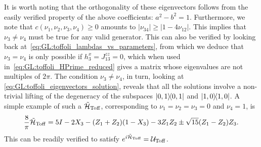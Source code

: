 It is worth noting that the orthogonality of these eigenvectors follows from the easily verified property of the above coefficients: $a^2 - b^2 = 1$.
Furthermore, we note that $c(\nu_1, \nu_2, \nu_3, \nu_4) \ge 0$ amounts to $|\nu_{34}|\ge|1-4\nu_{12}|$.
This implies that $\nu_3\neq\nu_4$ must be true for any valid generator. This can also be verified by looking back at~\cref{eq:GL:toffoli_lambdas_vs_parameters}, from which we deduce that $\nu_3=\nu_4$ is only possible if $h_3^x=J_{13}^{zz}=0$, which when used in~\cref{eq:GL:toffoli_HPrime_reduced} gives a matrix whose eigenvalues are not multiples of $2\pi$.
The condition $\nu_3\neq\nu_4$, in turn, looking at \cref{eq:GL:toffoli_eigenvectors_solution},
reveals that all the solutions involve a non-trivial lifting of the degeneracy of the subspaces $\ketbra{0,1}$ and $\ketbra{1,0}$.
A simple example of such a $\tilde{{\mathcal{H}}}_{\operatorname{Toff}}$, corresponding to $\nu_1=\nu_2=\nu_3=0$ and $\nu_4=1$, is
\begin{equation}
    \frac{8}{\pi}\tilde{{\mathcal{H}}}_{\operatorname{Toff}} =
    5 I - 2 X_3 - (Z_1 + Z_2)(1 - X_3)
    - 3 Z_1 Z_2 \pm \sqrt{15}(Z_1 - Z_2)Z_3.
\end{equation}
This can be readily verified to satisfy $e^{i\tilde{{\mathcal{H}}}_{\operatorname{Toff}}}={\mathcal{U}}_{\operatorname{Toff}}$.

